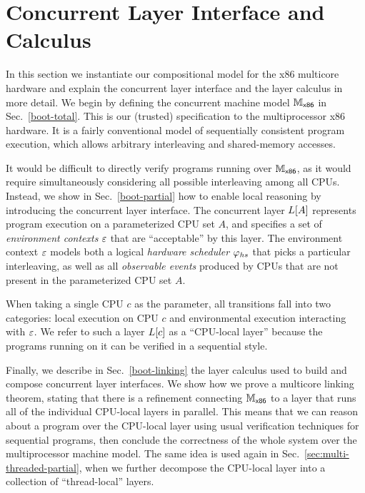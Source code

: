 \section{Concurrent Layer Interface and Calculus}
\label{sec:mach}
In this section we instantiate our compositional model
for the x86 multicore hardware and explain the concurrent layer interface and the layer calculus in more detail.
We begin by defining the concurrent machine model $\mathbb{M}_{\mathsf{x86}}$ in
Sec.~\ref{boot-total}. This is our (trusted)%
specification to the multiprocessor x86 hardware. It
is a fairly conventional model of sequentially consistent program
execution, which allows arbitrary interleaving
and shared-memory
accesses. 

It would be difficult to directly verify programs running 
over $\mathbb{M}_{\mathsf{x86}}$, as it would require
simultaneously considering
all possible interleaving among all CPUs.
Instead, we show in Sec.~\ref{boot-partial} how to enable local reasoning
by introducing the concurrent layer interface.
The concurrent layer $L[A]$ represents program execution 
on a parameterized CPU set $A$,
and specifies a set of \emph{environment contexts} $\oracle$
that are ``acceptable'' by this layer. The environment context $\oracle$
models both a logical \emph{hardware scheduler} $\varphi_{hs}$
that picks a particular interleaving, as well as all 
\emph{observable events} produced by CPUs that are not present in 
the parameterized CPU set $A$.

When taking  a single CPU $c$ as the parameter,
all  transitions
fall into two categories:
local execution on CPU $c$
and environmental execution  interacting with $\oracle$.
We refer to such a layer $L[c]$
as a ``CPU-local layer'' because the programs running on 
it can be verified in a sequential style.

Finally, we describe in Sec.~\ref{boot-linking} the layer calculus used to build and compose concurrent layer interfaces.
We show how we
prove a multicore linking theorem, stating that there is a refinement connecting $\mathbb{M}_{\mathsf{x86}}$ to
a layer that runs all of the individual CPU-local layers 
in parallel.
This means that we can reason about a program over the CPU-local layer
using usual verification techniques for sequential programs,
then conclude the correctness of the whole system over the
multiprocessor machine model.
The same idea is used again in
Sec.~\ref{sec:multi-threaded-partial}, when we further decompose the CPU-local layer 
into a collection of ``thread-local'' layers.

